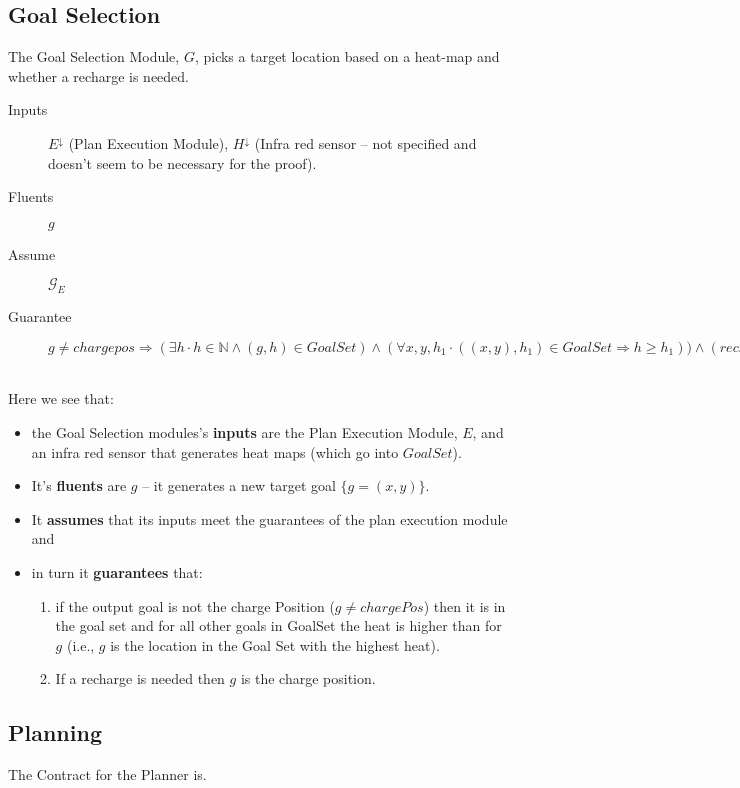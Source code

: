 \documentclass{blue-book}
\begin{document}
\subsection{Goal Selection}
The Goal Selection Module, $G$, picks a target location based on a  heat-map and whether a recharge is needed.
\begin{description}
\item[Inputs] $E^{\downarrow}$ (Plan Execution Module), $H^{\downarrow}$ (Infra red sensor -- not specified and doesn't seem to be necessary for the proof).
\item[Fluents] $g$
\item[Assume] $\mathcal{G}_E$
\item[Guarantee] $g \neq chargepos \Rightarrow (\exists h \cdot h \in \mathbb{N} \land (g,h) \in GoalSet) \land (\forall x,y,h_1 \cdot ((x,y),h_1) \in GoalSet \Rightarrow h \geq h_1) )  \land (recharge \iff g = chargePos)$\
\end{description}


Here we see that:

\begin{itemize}
\item the Goal Selection modules's {\bf inputs} are the Plan Execution Module, $E$, and an infra red sensor that generates heat maps (which go into $GoalSet$).

\item It's {\bf fluents} are $g$ -- it generates a new target goal $\{g = (x, y)\}$.  

\item It {\bf assumes} that its inputs meet the guarantees of the plan execution module and 
\item in turn it {\bf guarantees} that:

\begin{enumerate}
\item if the output goal is not the charge Position ($g \neq chargePos$) then it is in the goal set and for all other goals in GoalSet the heat is higher than for $g$ (i.e., $g$ is the location in the Goal Set with the highest heat).
\item If a recharge is needed then $g$ is the charge position.
\end{enumerate}
\end{itemize}

\subsection{Planning}
The Contract for the Planner is.
\end{document}
